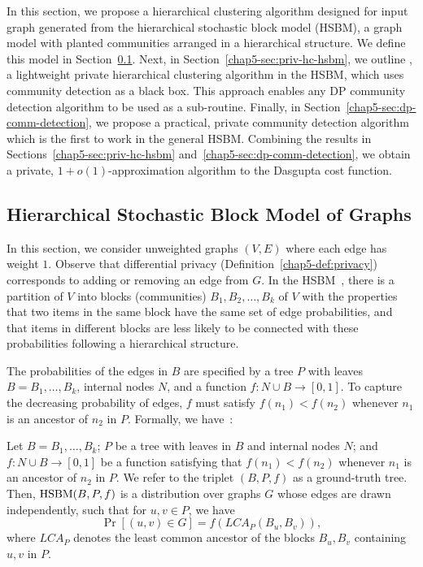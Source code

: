 
In this section, we propose a hierarchical clustering algorithm designed for input graph generated from the hierarchical stochastic block model (HSBM), a graph model with planted communities arranged in a hierarchical structure. We define this model in Section~\ref{chap5-sec:hsbm-setup}. Next, in Section~\ref{chap5-sec:priv-hc-hsbm}, we outline \dphcblocks{}, a lightweight private hierarchical clustering algorithm in the HSBM, which uses community detection as a black box. This approach enables any DP community detection algorithm to be used as a sub-routine. Finally, in Section~\ref{chap5-sec:dp-comm-detection}, we propose a practical, private community detection algorithm which is the first to work in the general HSBM. Combining the results in Sections~\ref{chap5-sec:priv-hc-hsbm} and~\ref{chap5-sec:dp-comm-detection}, we obtain a private, $1+o(1)$-approximation algorithm to the Dasgupta cost function.

\subsection{Hierarchical Stochastic Block Model of Graphs}\label{chap5-sec:hsbm-setup}

In this section, we consider unweighted graphs $(V,E)$ where each edge has weight $1$. Observe that differential privacy (Definition~\ref{chap5-def:privacy}) corresponds to adding or removing an edge from $G$. In the HSBM~\citep{cohen2017hierarchical}, there is a partition of $V$ into blocks (communities) $B_1, B_2, \ldots, B_k$ of $V$ with the properties that two items in the same block have the same set of edge probabilities, and that items in different blocks are less likely to be connected with these probabilities following a hierarchical structure.

The probabilities of the edges in $B$ are specified by a tree $P$ with leaves $B = B_1, \ldots, B_k$, internal nodes $N$, and a function $f : N \cup B \rightarrow [0,1]$. To capture the decreasing probability of edges,  $f$ must satisfy $f(n_1) < f(n_2)$ whenever $n_1$ is an ancestor of $n_2$ in $P$. Formally, we have~\citep{cohen2017hierarchical}:

\begin{defn}
Let $B = B_1, \ldots, B_k$; $P$ be a tree with leaves in $B$ and internal nodes $N$; and $f: N \cup B \rightarrow [0,1]$ be a function satisfying that $f(n_1) < f(n_2)$ whenever $n_1$ is an ancestor of $n_2$ in $P$. We refer to the triplet $(B,P,f)$ as a ground-truth tree. Then, $\textnormal{HSBM}(B,P,f)$ is a distribution over graphs $G$ whose edges are drawn independently, such that for $u,v \in P$, we have 
\[
\Pr[(u,v) \in G] = f(LCA_P(B_u, B_v)),
\]
where $LCA_P$ denotes the least common ancestor of the blocks $B_u, B_v$ containing $u,v$ in $P$. 
\end{defn}

